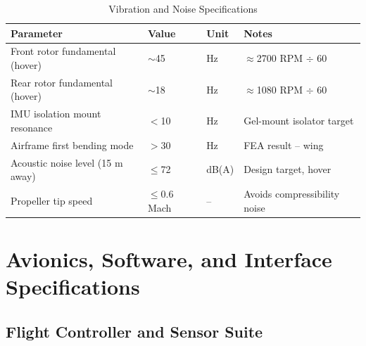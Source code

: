 \begin{table}[H]
\centering
\small
\caption{Vibration and Noise Specifications}
\begin{tabularx}{\textwidth}{L{5cm} C{3.2cm} C{1.5cm} X}
\toprule
\textbf{Parameter} &
\textbf{Value} &
\textbf{Unit} &
\textbf{Notes} \\
\midrule
Front rotor fundamental (hover) & $\sim$45     & Hz     & $\approx$2700 RPM $\div$ 60 \\
Rear rotor fundamental (hover)  & $\sim$18     & Hz     & $\approx$1080 RPM $\div$ 60 \\
IMU isolation mount resonance   & $<$10        & Hz     & Gel-mount isolator target \\
Airframe first bending mode     & $>$30        & Hz     & FEA result -- wing \\
Acoustic noise level (15 m away) & $\leq$72   & dB(A)  & Design target, hover \\
Propeller tip speed             & $\leq$0.6 Mach & --   & Avoids compressibility noise \\
\bottomrule
\end{tabularx}
\end{table}

\section{Avionics, Software, and Interface Specifications}

\subsection{Flight Controller and Sensor Suite}

